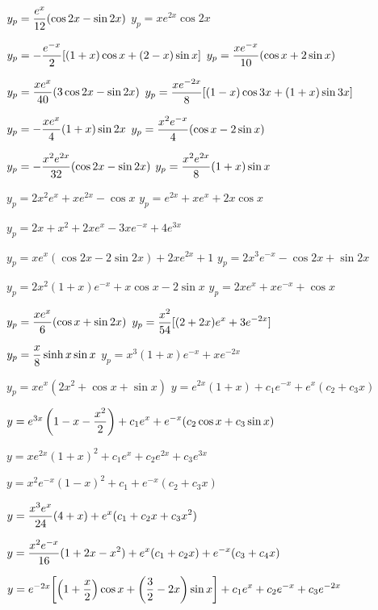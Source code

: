  $y_{p}=\displaystyle\frac{e^{x}}{12}(\cos2x-\sin2x)$
 $y_{p}=xe^{2x}\cos2x$

 $y_{p}=-\displaystyle\frac{e^{-x}}{2}[(1+x)\cos
x+(2-x)\sin x]$
 $y_{p}=\displaystyle\frac{xe^{-x}}{10}(\cos x+2\sin x)$

 $y_{p}=\displaystyle\frac{xe^{x}}{40}(3\cos2x-\sin2x)$
 $y_{p}=\displaystyle\frac{xe^{-2x}}{8}[(1-x)\cos
3x+(1+x)\sin3x]$

 $y_{p}=-\displaystyle\frac{xe^{x}}{4}(1+x)\sin2x$
 $y_{p}=\displaystyle\frac{x^{2}e^{-x}}{4}(\cos x-2\sin x)$

 $y_{p}=-\displaystyle\frac{x^{2}e^{2x}}{32}(\cos2x-\sin2x)$
 $y_{p}=\displaystyle\frac{x^{2}e^{2x}}{8}(1+x)\sin x$

 $y_{p}=2x^{2}e^{x}+xe^{2x}-\cos x$
 $y_{p}=e^{2x}+xe^{x}+2x\cos x$

 $y_{p}=2x+x^{2}+2xe^{x}-3xe^{-x}+4e^{3x}$

 $y_{p}=xe^{x}(\cos2x-2\sin2x)+2xe^{2x}+1$
 $y_{p}=2x^{3}e^{-x}-\cos2x+\sin2x$

 $y_{p}=2x^{2}(1+x)e^{-x}+x\cos x-2\sin x$
 $y_{p}=2xe^{x}+xe^{-x}+\cos x$

 $y_{p}=\displaystyle\frac{xe^{x}}{6}(\cos x+\sin2x)$
$y_{p}=\displaystyle\frac{x^{2}}{54}[(2+2x)e^{x}+3e^{-2x}]$

 $y_{p}=\displaystyle\frac{x}{8}\sinh x\sin x$
 $y_{p}=x^{3}(1+x)e^{-x}+xe^{-2x}$

 $y_{p}=xe^{x}(2x^{2}+\cos x+\sin x)$
  $y=e^{2x}(1+x)+c_{1}e^{-x}+e^{x}(c_{2}+c_{3}x)$

 $y=e^{3x}\displaystyle\left(1-x-\frac{x^{2}}{2}\right)+
c_{1}e^{x}+e^{-x}(c_{2}\cos x+c_{3}\sin x)$

 $y=xe^{2x}(1+x)^{2}+c_{1}e^{x}+c_{2}e^{2x}+c_{3}e^{3x}$

 $y=x^{2}e^{-x}(1-x)^{2}+c_{1}
+e^{-x}(c_{2}+c_{3}x)$

 $y=\displaystyle\frac{x^{3}e^{x}}{24}(4+x)
+e^{x}(c_{1}+c_{2}x+c_{3}x^{2})$

   $y=\displaystyle\frac{x^{2}e^{-x}}{16}(1+2x-x^{2})
+e^{x}(c_{1}+c_{2}x)+e^{-x}(c_{3}+c_{4}x)$

 $y=e^{-2x}\displaystyle{\left[\left(1+\frac{x}{2}\right)
\cos x+\left(\frac{3}{2}-2x\right)\sin x\right]}
+c_{1}e^{x}+c_{2}e^{-x}+c_{3}e^{-2x}$

